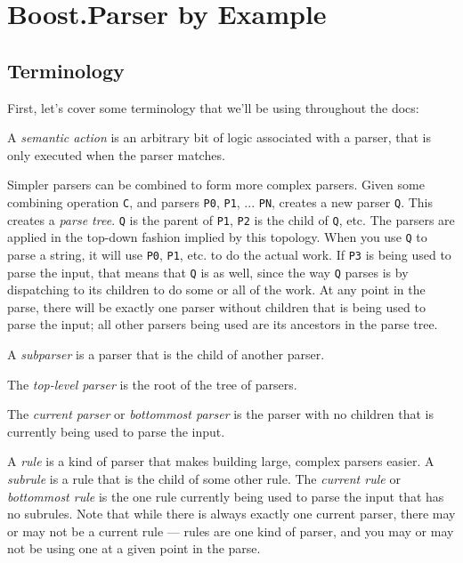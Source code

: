 \documentclass{MyBook}
\begin{document}
\frontmatter


\mainmatter
{}
\chapter{Boost.Parser by Example}


\section{Terminology}

First, let's cover some terminology that we'll be using throughout the docs:

A \emph{semantic action} is an arbitrary bit of logic associated with a parser, that is only executed when the parser matches.

Simpler parsers can be combined to form more complex parsers. Given some combining operation \texttt{C}, and parsers \texttt{P0}, \texttt{P1}, ... \texttt{PN},  creates a new parser \texttt{Q}. This creates a \emph{parse tree}. \texttt{Q} is the parent of \texttt{P1}, \texttt{P2} is the child of \texttt{Q}, etc. The parsers are applied in the top-down fashion implied by this topology. When you use \texttt{Q} to parse a string, it will use \texttt{P0}, \texttt{P1}, etc. to do the actual work. If \texttt{P3} is being used to parse the input, that means that \texttt{Q} is as well, since the way \texttt{Q} parses is by dispatching to its children to do some or all of the work. At any point in the parse, there will be exactly one parser without children that is being used to parse the input; all other parsers being used are its ancestors in the parse tree.

A \emph{subparser} is a parser that is the child of another parser.

The \emph{top-level parser} is the root of the tree of parsers.

The \emph{current parser} or \emph{bottommost parser} is the parser with no children that is currently being used to parse the input.

A \emph{rule} is a kind of parser that makes building large, complex parsers easier. A \emph{subrule} is a rule that is the child of some other rule. The \emph{current rule} or \emph{bottommost rule} is the one rule currently being used to parse the input that has no subrules. Note that while there is always exactly one current parser, there may or may not be a current rule --- rules are one kind of parser, and you may or may not be using one at a given point in the parse.
\end{document}
